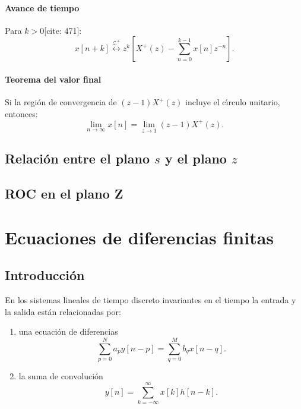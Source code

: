 \documentclass[11pt,a4paper,openany]{book}
\begin{document}
\subsubsection{Avance de tiempo}
Para $k > 0$[cite: 471]:
\begin{equation}
	x[n+k] \stackrel{\mathcal{Z}^+}{\longleftrightarrow} z^{k} \left[ X^{+}(z) - \sum_{n=0}^{k-1} x[n] z^{-n} \right].
\end{equation}

\subsubsection{Teorema del valor final}
Si la regi\'{o}n de convergencia de $(z-1) X^{+}(z)$ incluye el c\'{\i}rculo unitario, entonces:
\begin{equation}
	\lim_{n \to \infty} x[n] = \lim_{z \to 1} (z - 1) X^{+}(z).
\end{equation}

\section{Relación entre el plano $s$ y el plano $z$}

\section{ROC en el plano Z}

\chapter{Ecuaciones de diferencias finitas}

\section{Introducci\'{o}n}

En los sistemas lineales de tiempo discreto invariantes en el tiempo la entrada y la salida est\'{a}n relacionadas por:
\begin{enumerate}
	\item una ecuaci\'{o}n de diferencias 
	\begin{equation}
		\sum_{p=0}^{N}a_{p} y[n-p] = \sum_{q=0}^{M}b_{q} x[n-q]. \label{eqdiferencia}
	\end{equation}
	
	\item la suma de convoluci\'{o}n
	\begin{equation}
		y[n] = \sum_{k=-\infty}^{\infty} x[k] h[n - k].
	\end{equation}
\end{enumerate}
\end{document}
